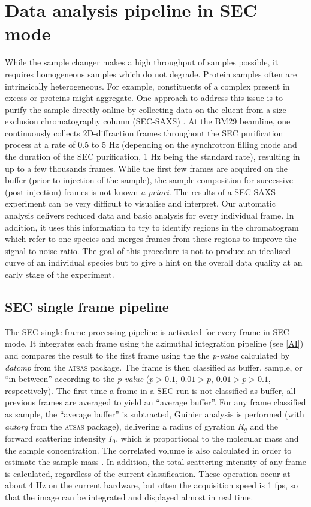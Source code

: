 \documentclass[preprint,pdf]{iucr}              %
\begin{document}
\section{Data analysis pipeline in SEC mode}
While the sample changer makes a high throughput of samples possible, it
requires homogeneous samples which do not degrade.
Protein samples often are intrinsically heterogeneous.
For example, constituents of a complex present in excess or proteins
might aggregate.
One approach to address this issue is to purify the sample directly online by collecting data
on the eluent from a size-exclusion chromatography column (SEC-SAXS) \cite{SECPaper2012,SECP12,SECSWING}.
At the BM29 beamline, one continuously collects 2D-diffraction frames
throughout the SEC purification process at a rate of 0.5 to 5 Hz
(depending on the synchrotron filling mode and the duration of the SEC
purification, 1 Hz being the standard rate), resulting in up to a few thousands
frames.
While the first few frames are acquired on the buffer (prior to injection of the sample), the sample composition
for successive (post injection) frames is not known \textit{a priori}.
The results of a SEC-SAXS experiment can be very difficult to visualise and interpret.
Our automatic analysis delivers reduced data and basic analysis for
every individual frame.
In addition, it uses this information to try to identify regions in the
chromatogram which refer to one species and merges frames from these
regions to improve the signal-to-noise ratio.
The goal of this procedure is not to produce an idealised curve of an individual
species but to give a hint on the overall data quality at an early stage of
the experiment.

\subsection{SEC single frame pipeline}

The SEC single frame processing pipeline is activated for every frame in SEC
mode.
It integrates each frame using the azimuthal integration pipeline (see
\ref{AI}) and compares the result to the first frame using the the
\textit{p-value} calculated by \textit{datcmp} from the \textsc{atsas} package.
The frame is then classified as buffer, sample, or ``in between''
according to the \textit{p-value} ($p>0.1$, $0.01 > p$, $0.01>p>0.1$, 
respectively).
The first time a frame in a SEC run is not classified as buffer, all previous
frames are averaged to yield an ``average buffer''.
For any frame classified as sample, the ``average buffer'' is subtracted, Guinier
analysis is performed (with \textit{autorg} from the \textsc{atsas} package),
delivering a radius of gyration $R_g$ and the forward scattering intensity
$I_0$, which is proportional to the molecular mass and the sample concentration. 
The correlated volume is also calculated in order to estimate the
sample mass \cite{RamboTainerNature2013}.
In addition, the total scattering intensity of any
frame is calculated, regardless of the current classification.
These operation occur at about 4 Hz on the current hardware, but often the
acquisition speed is 1 fps, so that the image can be integrated and displayed
almost in real time.
\end{document}
